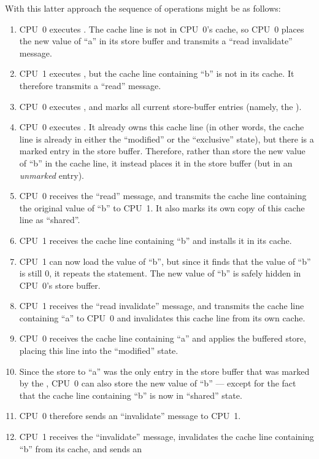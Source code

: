 With this latter approach the sequence of operations might be as follows:
\begin{enumerate}
\item	CPU~0 executes .  The cache line is not in
	CPU~0's cache, so CPU~0 places the new value of ``a'' in its
	store buffer and transmits a ``read invalidate'' message.
\item	CPU~1 executes , but the cache line
	containing ``b'' is not in its cache.
	It therefore transmits a ``read'' message.
\item	CPU~0 executes , and marks all current store-buffer
	entries (namely, the ).
\item	CPU~0 executes .
	It already owns this cache line (in other words, the cache line
	is already in either the ``modified'' or the ``exclusive'' state),
	but there is a marked entry in the store buffer.
	Therefore, rather than store the new value of ``b'' in the
	cache line, it instead places it in the store buffer (but
	in an \emph{unmarked} entry).
\item	CPU~0 receives the ``read'' message, and transmits the
	cache line containing the original value of ``b''
	to CPU~1.
	It also marks its own copy of this cache line as ``shared''.
\item	CPU~1 receives the cache line containing ``b'' and installs
	it in its cache.
\item	CPU~1 can now load the value of ``b'',
	but since it finds that the value of ``b'' is still 0, it repeats
	the  statement.
	The new value of ``b'' is safely hidden in CPU~0's store buffer.
\item	CPU~1 receives the ``read invalidate'' message, and
	transmits the cache line containing ``a'' to CPU~0 and
	invalidates this cache line from its own cache.
\item	CPU~0 receives the cache line containing ``a'' and applies
	the buffered store, placing this line into the ``modified''
	state.
\item	Since the store to ``a'' was the only
	entry in the store buffer that was marked by the ,
	CPU~0 can also store the new value of ``b'' --- except for the
	fact that the cache line containing ``b'' is now in ``shared''
	state.
\item	CPU~0 therefore sends an ``invalidate'' message to CPU~1.
\item	CPU~1 receives the ``invalidate'' message, invalidates the
	cache line containing ``b'' from its cache, and sends an

\end{enumerate}
